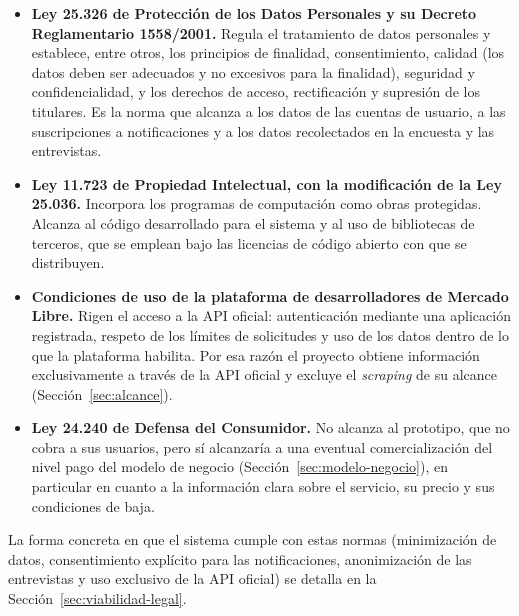 \begin{itemize}
	\item \textbf{Ley 25.326 de Protección de los Datos Personales y su Decreto Reglamentario 1558/2001.} Regula el tratamiento de datos personales y establece, entre otros, los principios de finalidad, consentimiento, calidad (los datos deben ser adecuados y no excesivos para la finalidad), seguridad y confidencialidad, y los derechos de acceso, rectificación y supresión de los titulares. Es la norma que alcanza a los datos de las cuentas de usuario, a las suscripciones a notificaciones y a los datos recolectados en la encuesta y las entrevistas.
	\item \textbf{Ley 11.723 de Propiedad Intelectual, con la modificación de la Ley 25.036.} Incorpora los programas de computación como obras protegidas. Alcanza al código desarrollado para el sistema y al uso de bibliotecas de terceros, que se emplean bajo las licencias de código abierto con que se distribuyen.
	\item \textbf{Condiciones de uso de la plataforma de desarrolladores de Mercado Libre.} Rigen el acceso a la API oficial: autenticación mediante una aplicación registrada, respeto de los límites de solicitudes y uso de los datos dentro de lo que la plataforma habilita. Por esa razón el proyecto obtiene información exclusivamente a través de la API oficial y excluye el \emph{scraping} de su alcance (Sección~\ref{sec:alcance}).
	\item \textbf{Ley 24.240 de Defensa del Consumidor.} No alcanza al prototipo, que no cobra a sus usuarios, pero sí alcanzaría a una eventual comercialización del nivel pago del modelo de negocio (Sección~\ref{sec:modelo-negocio}), en particular en cuanto a la información clara sobre el servicio, su precio y sus condiciones de baja.
\end{itemize}

La forma concreta en que el sistema cumple con estas normas (minimización de datos, consentimiento explícito para las notificaciones, anonimización de las entrevistas y uso exclusivo de la API oficial) se detalla en la Sección~\ref{sec:viabilidad-legal}.
